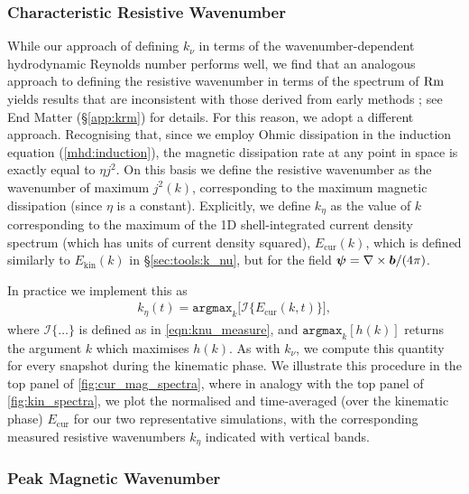 \subsubsection{Characteristic Resistive Wavenumber}
\label{sec:tools:k_eta}

While our approach of defining $k_\nu$ in terms of the wavenumber-dependent hydrodynamic Reynolds number performs well, we find that an analogous approach to defining the resistive wavenumber in terms of the spectrum of $\mathrm{Rm}$ yields results that are inconsistent with those derived from early methods \citep{kulsrud1992spectrum, kriel2022fundamental, brandenburg2023dissipative}; see End Matter (\S\ref{app:krm}) for details. For this reason, we adopt a different approach. Recognising that, since we employ Ohmic dissipation in the induction equation (\autoref{mhd:induction}), the magnetic dissipation rate at any point in space is exactly equal to $\eta j^2$. On this basis we define the resistive wavenumber as the wavenumber of maximum $j^2(k)$, corresponding to the maximum magnetic dissipation (since $\eta$ is a constant). Explicitly, we define $k_\eta$ as the value of $k$ corresponding to the maximum of the 1D shell-integrated current density spectrum (which has units of current density squared), $E_\mathrm{cur}(k)$, which is defined similarly to $E_\mathrm{kin}(k)$ in \S\ref{sec:tools:k_nu}, but for the field $\bm{\psi} = \nabla\times\bm{b} / (4\pi)$.

In practice we implement this as
\begin{align}
    k_\eta(t)
        = \texttt{argmax}_k\Big[
            \mathcal{I}\Big\{ E_\mathrm{cur}(k, t) \Big\}
        \Big]
        , \label{eqn:keta_measure}
\end{align}
where $\mathcal{I}\{\dots\}$ is defined as in \autoref{eqn:knu_measure}, and $\texttt{argmax}_k[h(k)]$ returns the argument $k$ which maximises $h(k)$. As with $k_\nu$, we compute this quantity for every snapshot during the kinematic phase. We illustrate this procedure in the top panel of \autoref{fig:cur_mag_spectra}, where in analogy with the top panel of \autoref{fig:kin_spectra}, we plot the normalised and time-averaged (over the kinematic phase) $E_\mathrm{cur}$ for our two representative simulations, with the corresponding measured resistive wavenumbers $k_\eta$ indicated with vertical bands.

\subsubsection{Peak Magnetic Wavenumber}
\label{sec:tools:k_p}

